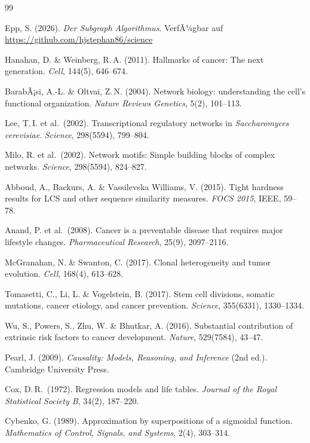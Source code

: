 ﻿\documentclass[12pt, a4paper]{article}
\theoremstyle{definition}
\theoremstyle{remark}
\begin{document}
\begin{thebibliography}{99}

Epp, S. (2026).
\textit{Der Subgraph Algorithmus}. VerfÃ¼gbar auf
\url{https://github.com/hjstephan86/science}

Hanahan, D. \& Weinberg, R.\,A. (2011).
Hallmarks of cancer: The next generation.
\textit{Cell}, 144(5), 646--674.

BarabÃ¡si, A.-L. \& Oltvai, Z.\,N. (2004).
Network biology: understanding the cell's functional organization.
\textit{Nature Reviews Genetics}, 5(2), 101--113.

Lee, T.\,I. et al.\ (2002).
Transcriptional regulatory networks in \textit{Saccharomyces cerevisiae}.
\textit{Science}, 298(5594), 799--804.

Milo, R. et al.\ (2002).
Network motifs: Simple building blocks of complex networks.
\textit{Science}, 298(5594), 824--827.

Abboud, A., Backurs, A. \& Vassilevska Williams, V. (2015).
Tight hardness results for LCS and other sequence similarity measures.
\textit{FOCS 2015}, IEEE, 59--78.

Anand, P. et al.\ (2008).
Cancer is a preventable disease that requires major lifestyle changes.
\textit{Pharmaceutical Research}, 25(9), 2097--2116.

McGranahan, N. \& Swanton, C. (2017).
Clonal heterogeneity and tumor evolution.
\textit{Cell}, 168(4), 613--628.

Tomasetti, C., Li, L. \& Vogelstein, B. (2017).
Stem cell divisions, somatic mutations, cancer etiology, and cancer prevention.
\textit{Science}, 355(6331), 1330--1334.

Wu, S., Powers, S., Zhu, W. \& Bhutkar, A. (2016).
Substantial contribution of extrinsic risk factors to cancer development.
\textit{Nature}, 529(7584), 43--47.

Pearl, J. (2009).
\textit{Causality: Models, Reasoning, and Inference} (2nd ed.).
Cambridge University Press.

Cox, D.\,R.\ (1972).
Regression models and life tables.
\textit{Journal of the Royal Statistical Society B}, 34(2), 187--220.

Cybenko, G. (1989).
Approximation by superpositions of a sigmoidal function.
\textit{Mathematics of Control, Signals, and Systems}, 2(4), 303--314.

\end{thebibliography}
\end{document}
